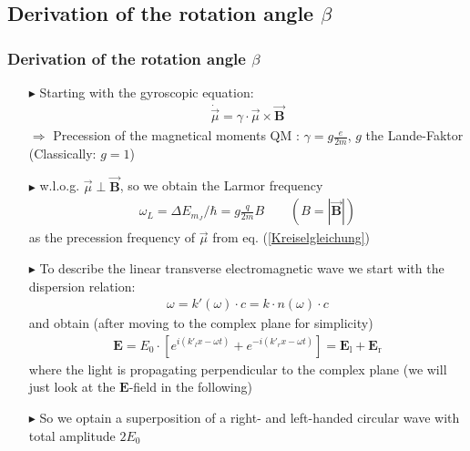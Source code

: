 \documentclass[11pt,a4paper]{beamer}
\begin{document}
\begin{frame}
\subsection{Derivation of the rotation angle $\beta$}
\frametitle{Derivation of the rotation angle $\beta$}
\begin{itemize}
\item[$\blacktriangleright$]
Starting with the gyroscopic equation:
\begin{align}
\dot{\vec{\mu}} = \gamma\cdot\vec{\mu}\times\vec{\textbf{B}}
\label{Kreiselgleichung}
\end{align}
$\Rightarrow$ Precession of the magnetical moments
\newline \newline
QM : $\gamma = g\frac{e}{2m}$, $g$ the Lande-Faktor
(Classically: $g=1$)\newline \newline
\item[$\blacktriangleright$]
w.l.o.g. $\vec{\mu} \perp \vec{\textbf{B}}$, so we obtain the Larmor frequency
\begin{align}
\omega_L = \Delta E_{m_J}/ \hbar = g\frac{q}{2m}B \qquad (B = |\vec{\textbf{B}}|)
\label{Larmorfrequenz}
\end{align}
as the precession frequency of $\vec{\mu}$ from eq. (\ref{Kreiselgleichung})
\end{itemize}
\end{frame}
\begin{frame}
\begin{itemize}
\item[$\blacktriangleright$]
To describe the linear transverse electromagnetic wave we start with the dispersion relation:
\begin{align}
\omega = k'(\omega)\cdot c = k\cdot n(\omega)\cdot c
\label{Dispersionsrelation}
\end{align}
and obtain (after moving to the complex plane for simplicity)
 \begin{align}
\textbf{E} = E_0\cdot[e^{i( k'_l x - \omega t)}+e^{-i( k'_r x - \omega t )}] = \textbf{E}_{\text{l}} + \textbf{E}_{\text{r}}
\label{Lichtwelle_1}
 \end{align} 
where the light is propagating perpendicular to the complex plane (we will just look at the $\textbf{E}$-field in the following)\newline
\item[$\blacktriangleright$] So we optain a superposition of a right- and left-handed circular wave with total amplitude $2E_0$
\end{itemize}
\end{frame}
\end{document}
